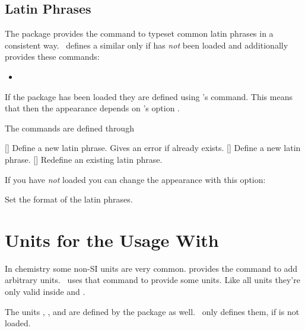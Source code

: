 \documentclass[load-preamble+]{cnltx-doc}
\begin{document}
\subsection{Latin Phrases}

The package  provides the command  to typeset common
latin phrases in a consistent way.  \chemmacros\ defines a similar 
only if  has \emph{not} been loaded and additionally provides
these commands:
\begin{itemize}
  \item[]
       \insitu \quad
     \abinitio \quad
      \invacuo
\end{itemize}

If the package  has been loaded they are defined using
's  command.  This means that then the appearance
depends on 's option .

The commands are defined through
\begin{commands}
  []
    Define a new latin phrase. Gives an error if 
    already exists.
  []
    Define a new latin phrase.
  []
    Redefine an existing latin phrase.
\end{commands}
\begin{example}
  \NewChemLatin{}\ltn
\end{example}
If you have \emph{not} loaded  you can change the appearance
with this option:
\begin{options}
    Set the format of the latin phrases.
\end{options}

\section{Units for the Usage With }\label{sec:einheiten}

In chemistry some non-SI units are very common.   provides the
command  to add arbitrary units.
\chemmacros\ uses that command to provide some units.  Like all 
units they're only valid inside  and
.
\begin{commands}
   \si{\atmosphere}
   \si{\atm}
   \si{\calory}
   \si{\cal}
   \si{\cmc} \par
    The units , , and  are defined by the
    package  as well.  \chemmacros\ only defines them, if
     is not loaded.
   \si{\molar}
   \si{\moLar}
   \si{\Molar}
   \si{\MolMass}
   \si{\normal}
   \si{\torr}
\end{commands}
\end{document}
